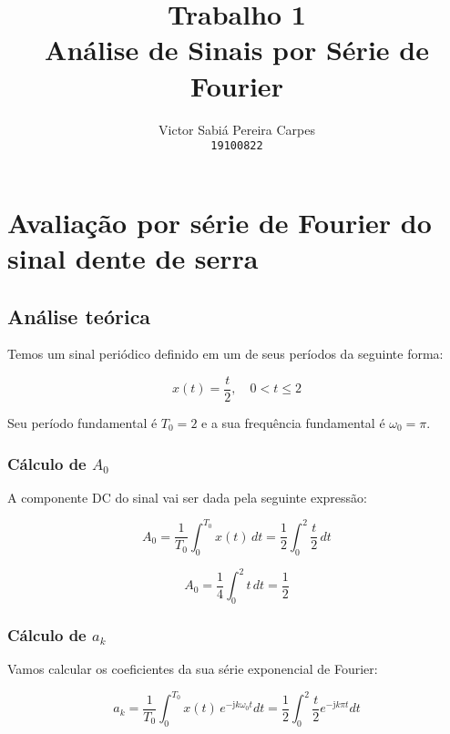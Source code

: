 \documentclass[10pt,twocolumn]{article}
\renewcommand{\j}{\ensuremath{\mathrm{j}}}
\newcommand{\?}{\stackrel{?}{=}}
\begin{document}
	
	\title{Trabalho 1\\
		\large Análise de Sinais por Série de Fourier}
	\author{Victor Sabiá Pereira Carpes\\
		\texttt{19100822}}
	
	\maketitle
	
\section{Avaliação por série de Fourier do sinal dente de serra}

\subsection{Análise teórica}

Temos um sinal periódico definido em um de seus períodos da seguinte forma:

\begin{equation*}
	x(t)=\frac{t}{2},\quad0<t\leq2
\end{equation*}

Seu período fundamental é $T_0=2$ e a sua frequência fundamental é $\omega_0=\pi$.

\subsubsection{Cálculo de $A_0$}

A componente DC do sinal vai ser dada pela seguinte expressão:

\begin{equation*}
	A_0=\frac{1}{T_0}\int_{0}^{T_0}x(t)\,dt=\frac{1}{2}\int_{0}^{2}\frac{t}{2}\,dt
\end{equation*}

\begin{equation*}
	A_0=\frac{1}{4}\int_{0}^{2}t\,dt=\frac{1}{2}
\end{equation*}

\subsubsection{Cálculo de $a_k$}

Vamos calcular os coeficientes da sua série exponencial de Fourier:

\begin{equation*}
	a_k=\frac{1}{T_0}\int_{0}^{T_0}x(t)\,e^{-\j k\omega_0 t}dt=\frac{1}{2}\int_{0}^{2}\frac{t}{2}e^{-\j k\pi t}dt
\end{equation*}
\end{document}
